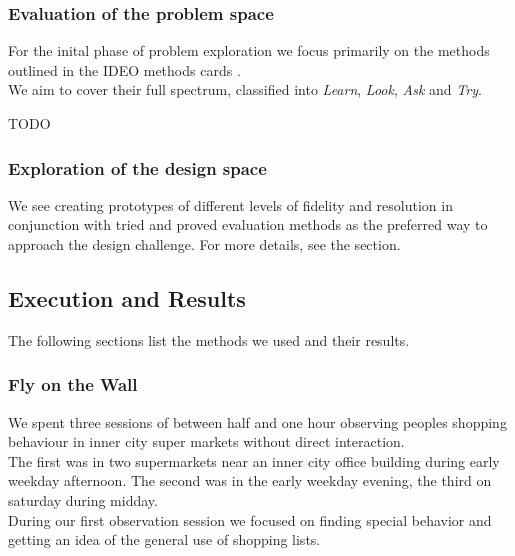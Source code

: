\documentclass{scrartcl}
\begin{document}
    \subsubsection{Evaluation of the problem space}
      For the inital phase of problem exploration we focus primarily on the methods outlined in the IDEO methods cards \cite{TODO}.\\
      We aim to cover their full spectrum, classified into \textit{Learn}, \textit{Look}, \textit{Ask} and \textit{Try}.

      TODO

    \subsubsection{Exploration of the design space}
      We see creating prototypes of different levels of fidelity and resolution in conjunction with tried and proved evaluation methods as the preferred way to approach the design challenge. For more details, see the  section.

  \subsection{Execution and Results}
    The following sections list the methods we used and their results.

    \subsubsection{Fly on the Wall}
      We spent three sessions of between half and one hour observing peoples shopping behaviour in inner city super markets without direct interaction.\\
      The first was in two supermarkets near an inner city office building during early weekday afternoon.
      The second was in the early weekday evening, the third on saturday during midday.\\

      During our first observation session we focused on finding special behavior and getting an idea of the general use of shopping lists.\\
\end{document}
